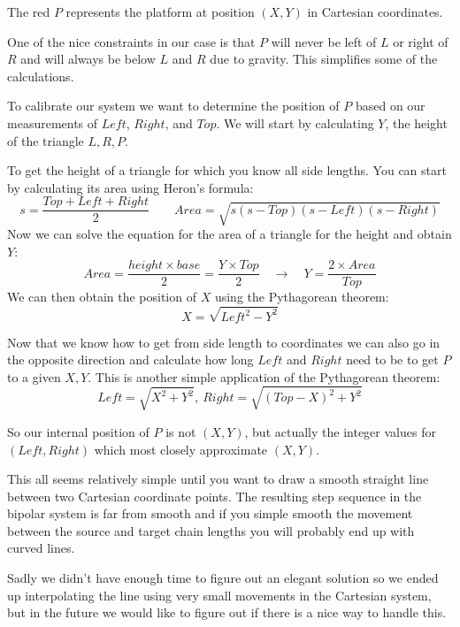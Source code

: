 \documentclass[a4paper,10pt]{article}
\begin{document}
The red $P$ represents the platform at position $(X,Y)$ in Cartesian
coordinates.

One of the nice constraints in our case is that $P$ will never be
left of $L$ or right of $R$ and will always be below $L$ and $R$ due
to gravity. This simplifies some of the calculations.

To calibrate our system we want to determine the position of $P$ based
on our measurements of $Left$, $Right$, and $Top$.
We will start by calculating $Y$, the height of the triangle $L,R,P$.

To get the height of a triangle for which you know all side lengths.
You can start by calculating its area using Heron's formula:
$$s = \frac{Top + Left + Right}{2}\qquad Area = \sqrt{s(s-Top)(s-Left)(s-Right)}$$
%
Now we can solve the equation for the area of a triangle for the height
and obtain $Y$:
$$Area = \frac{height \times base}{2} = \frac{Y \times Top}{2}
\quad \rightarrow \quad Y = \frac{2 \times Area}{Top}$$
%
We can then obtain the position of $X$ using the Pythagorean theorem:
$$X = \sqrt{Left^2 - Y^2}$$

Now that we know how to get from side length to coordinates we can
also go in the opposite direction and calculate how long $Left$ and
$Right$ need to be to get $P$ to a given $X,Y$.
This is another simple application of the Pythagorean theorem:
$$Left = \sqrt{X^2 + Y^2},\ Right = \sqrt{(Top - X)^2 + Y^2}$$

So our internal position of $P$ is not $(X,Y)$, but actually the
integer values for $(Left,Right)$ which most closely approximate $(X,Y)$.

This all seems relatively simple until you want to draw a smooth
straight line between two Cartesian coordinate points.
The resulting step sequence in the bipolar system is far from smooth
and if you simple smooth the movement between the source and target
chain lengths you will probably end up with curved lines.

Sadly we didn't have enough time to figure out an elegant solution so
we ended up interpolating the line using very small movements in the
Cartesian system, but in the future we would like to figure out if
there is a nice way to handle this.


\end{document}
